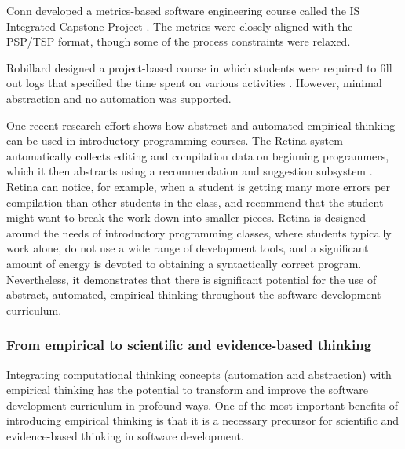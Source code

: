 Conn developed a metrics-based software engineering course called the 
IS Integrated Capstone Project \cite{Conn04}.  The metrics were closely aligned
with the PSP/TSP format, though some of the process constraints were relaxed. 

Robillard designed a project-based course in which students were required
to fill out logs that specified the time spent on various activities
\cite{Robillard98}.  However, minimal abstraction and no automation was supported.

One recent research effort shows how abstract and automated empirical
thinking can be used in introductory programming courses. The Retina system
automatically collects editing and compilation data on beginning
programmers, which it then abstracts using a recommendation and suggestion
subsystem \cite{Murphy09}.  Retina can notice, for example, when a student
is getting many more errors per compilation than other students in the
class, and recommend that the student might want to break the work down
into smaller pieces.  Retina is designed around the needs of introductory
programming classes, where students typically work alone, do not use a wide
range of development tools, and a significant amount of energy is devoted
to obtaining a syntactically correct program.  Nevertheless, it
demonstrates that there is significant potential for the use of abstract,
automated, empirical thinking throughout the software development
curriculum.

\subsubsection{From empirical to scientific and evidence-based thinking}

Integrating computational thinking concepts (automation and abstraction)
with empirical thinking has the potential to transform and improve the
software development curriculum in profound ways. One of the most important
benefits of introducing empirical thinking is that it is a necessary
precursor for scientific and evidence-based thinking in software
development.

